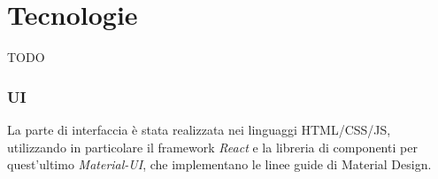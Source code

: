 \chapter{Tecnologie}

TODO
\subsection{UI}

La parte di interfaccia è stata realizzata nei linguaggi HTML/CSS/JS, utilizzando in particolare il framework \textit{React}\cite{react} e la libreria di componenti per quest'ultimo \textit{Material-UI}\cite{material_ui}, che implementano le linee guide di Material Design\cite{material_design}.